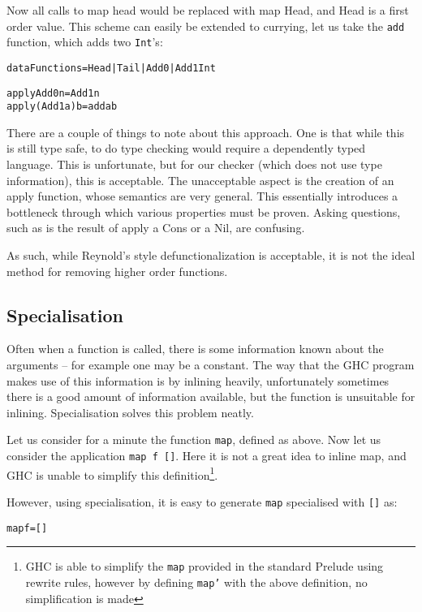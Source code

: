 \documentclass[preprint]{sigplanconf}
\newcommand{\T}[1]{\texttt{#1}}
\begin{document}
Now all calls to map head would be replaced with map Head, and Head is a first
order value. This scheme can easily be extended to currying, let us take the
\T{add} function, which adds two \T{Int}'s:

\begin{alltt}
 data Functions = Head | Tail | Add0 | Add1 Int

 apply Add0 n = Add1 n
 apply (Add1 a) b = add a b
\end{alltt}

There are a couple of things to note about this approach. One is that while
this is still type safe, to do type checking would require a dependently typed
language. This is unfortunate, but for our checker (which does not use type
information), this is acceptable. The unacceptable aspect is the creation of an
apply function, whose semantics are very general. This essentially introduces a
bottleneck through which various properties must be proven. Asking questions,
such as is the result of apply a Cons or a Nil, are confusing.

As such, while Reynold's style defunctionalization is acceptable, it is not the
ideal method for removing higher order functions.

\subsection{Specialisation}

Often when a function is called, there is some information known about the
arguments -- for example one may be a constant. The way that the GHC program
makes use of this information is by inlining heavily, unfortunately sometimes
there is a good amount of information available, but the function is unsuitable
for inlining. Specialisation solves this problem neatly.

Let us consider for a minute the function \T{map}, defined as above. Now let us
consider the application \T{map f []}. Here it is not a great idea to inline
map, and GHC is unable to simplify this definition\footnote{GHC is able to
simplify the \T{map} provided in the standard Prelude using rewrite rules,
however by defining \T{map'} with the above definition, no simplification is
made}.

However, using specialisation, it is easy to generate \T{map} specialised with
\T{[]} as:

\begin{alltt}
 map f = []
\end{alltt}
\end{document}
